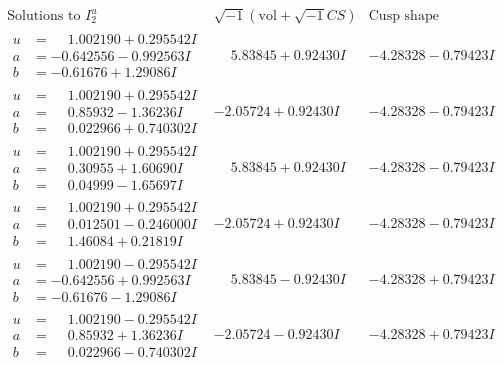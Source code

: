 \documentclass[1p]{elsarticle_modified}
\theoremstyle{definition}
\newcommand{\I}{\sqrt{-1}}
\begin{document}
$$\begin{array}{c|c|c}  
\text{Solutions to }I^u_{2}& \I (\text{vol} + \sqrt{-1}CS) & \text{Cusp shape}\\
 \hline 
\begin{aligned}
u &= \phantom{-}1.002190 + 0.295542 I \\
a &= -0.642556 - 0.992563 I \\
b &= -0.61676 + 1.29086 I\end{aligned}
 & \phantom{-}5.83845 + 0.92430 I & -4.28328 - 0.79423 I \\ \hline\begin{aligned}
u &= \phantom{-}1.002190 + 0.295542 I \\
a &= \phantom{-}0.85932 - 1.36236 I \\
b &= \phantom{-}0.022966 + 0.740302 I\end{aligned}
 & -2.05724 + 0.92430 I & -4.28328 - 0.79423 I \\ \hline\begin{aligned}
u &= \phantom{-}1.002190 + 0.295542 I \\
a &= \phantom{-}0.30955 + 1.60690 I \\
b &= \phantom{-}0.04999 - 1.65697 I\end{aligned}
 & \phantom{-}5.83845 + 0.92430 I & -4.28328 - 0.79423 I \\ \hline\begin{aligned}
u &= \phantom{-}1.002190 + 0.295542 I \\
a &= \phantom{-}0.012501 - 0.246000 I \\
b &= \phantom{-}1.46084 + 0.21819 I\end{aligned}
 & -2.05724 + 0.92430 I & -4.28328 - 0.79423 I \\ \hline\begin{aligned}
u &= \phantom{-}1.002190 - 0.295542 I \\
a &= -0.642556 + 0.992563 I \\
b &= -0.61676 - 1.29086 I\end{aligned}
 & \phantom{-}5.83845 - 0.92430 I & -4.28328 + 0.79423 I \\ \hline\begin{aligned}
u &= \phantom{-}1.002190 - 0.295542 I \\
a &= \phantom{-}0.85932 + 1.36236 I \\
b &= \phantom{-}0.022966 - 0.740302 I\end{aligned}
 & -2.05724 - 0.92430 I & -4.28328 + 0.79423 I \\ \hline\begin{aligned}

\end{aligned}
\end{array}$$
\end{document}
